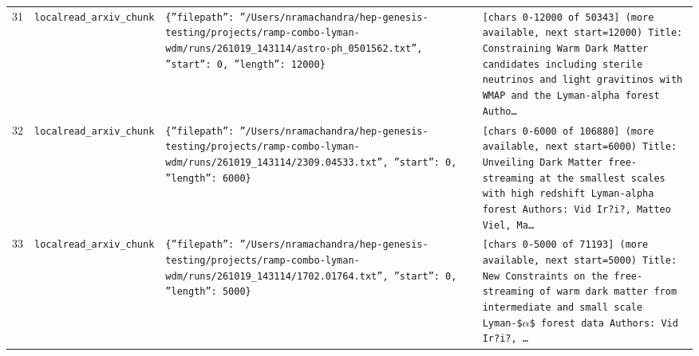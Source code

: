 \documentclass[11pt,a4paper]{article}
\begin{document}
\begin{longtable}{@{}p{}p{}p{}p{}@{}}
31 & \texttt{local}\newline\texttt{read\_\allowbreak{}arxiv\_\allowbreak{}chunk} & \texttt{\{''filepath'':\allowbreak{} ''/\allowbreak{}Users/\allowbreak{}nramachandra/\allowbreak{}hep-genesis-testing/\allowbreak{}projects/\allowbreak{}ramp-combo-lyman-wdm/\allowbreak{}runs/\allowbreak{}261019\_\allowbreak{}143114/\allowbreak{}astro-ph\_\allowbreak{}0501562.txt'',\allowbreak{} ''start'':\allowbreak{} 0,\allowbreak{} ''length'':\allowbreak{} 12000\}\allowbreak{}} & \texttt{[chars 0-12000 of 50343]\allowbreak{} (more available,\allowbreak{} next start=\allowbreak{}12000)\allowbreak{}  Title:\allowbreak{} Constraining Warm Dark Matter candidates including sterile neutrinos and light gravitinos with WMAP and the Lyman-alpha forest Autho\ldots{}\allowbreak{}} \\
32 & \texttt{local}\newline\texttt{read\_\allowbreak{}arxiv\_\allowbreak{}chunk} & \texttt{\{''filepath'':\allowbreak{} ''/\allowbreak{}Users/\allowbreak{}nramachandra/\allowbreak{}hep-genesis-testing/\allowbreak{}projects/\allowbreak{}ramp-combo-lyman-wdm/\allowbreak{}runs/\allowbreak{}261019\_\allowbreak{}143114/\allowbreak{}2309.04533.txt'',\allowbreak{} ''start'':\allowbreak{} 0,\allowbreak{} ''length'':\allowbreak{} 6000\}\allowbreak{}} & \texttt{[chars 0-6000 of 106880]\allowbreak{} (more available,\allowbreak{} next start=\allowbreak{}6000)\allowbreak{}  Title:\allowbreak{} Unveiling Dark Matter free-streaming at the smallest scales with high redshift Lyman-alpha forest Authors:\allowbreak{} Vid Ir?i?,\allowbreak{} Matteo Viel,\allowbreak{} Ma\ldots{}\allowbreak{}} \\
33 & \texttt{local}\newline\texttt{read\_\allowbreak{}arxiv\_\allowbreak{}chunk} & \texttt{\{''filepath'':\allowbreak{} ''/\allowbreak{}Users/\allowbreak{}nramachandra/\allowbreak{}hep-genesis-testing/\allowbreak{}projects/\allowbreak{}ramp-combo-lyman-wdm/\allowbreak{}runs/\allowbreak{}261019\_\allowbreak{}143114/\allowbreak{}1702.01764.txt'',\allowbreak{} ''start'':\allowbreak{} 0,\allowbreak{} ''length'':\allowbreak{} 5000\}\allowbreak{}} & \texttt{[chars 0-5000 of 71193]\allowbreak{} (more available,\allowbreak{} next start=\allowbreak{}5000)\allowbreak{}  Title:\allowbreak{} New Constraints on the free-streaming of warm dark matter from intermediate and small scale Lyman-\$$\alpha$\$ forest data Authors:\allowbreak{} Vid Ir?i?,\allowbreak{} \ldots{}\allowbreak{}} \\

\end{longtable}
\end{document}
